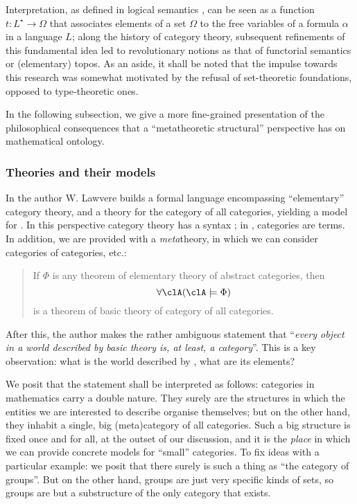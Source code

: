Interpretation, as defined in logical semantics \cite{}, can be seen as a function $t : L^\star \to \Omega$ that associates elements of a set $\Omega$ to the free variables of a formula $\alpha$ in a language $L$; along the history of category theory, subsequent refinements of this fundamental idea led to revolutionary notions as that of functorial semantics or (elementary) topos.
As an aside, it shall be noted that the impulse towards this research was somewhat motivated by the refusal of set-theoretic foundations, opposed to type-theoretic ones.

In the following subsection, we give a more fine-grained presentation of the philosophical consequences that a ``metatheoretic structural'' perspective has on mathematical ontology.
\subsubsection{Theories and their models}
In \cite{lajolla} the author W. Lawvere builds a formal language  encompassing ``elementary'' category theory, and a theory  for the category of all categories, yielding a model for . In this perspective category theory has a syntax \CT; in \CT, categories are terms. In addition, we are provided with a \emph{meta}theory, in which we can consider categories of categories, etc.:%
\begin{quote}
	If $\Phi$ is any theorem of elementary theory of abstract categories, then
  \[\forall \clA (\clA \models \Phi)\]
  is a theorem of basic theory of category of all categories. \hfill \cite{lajolla}
\end{quote}
After this, the author makes the rather ambiguous statement that ``\textit{every object in a world described by basic theory is, at least, a category}''. This is a key observation: what is the world described by , what are its elements?

We posit that the statement shall be interpreted as follows: categories in mathematics carry a double nature. They surely are the structures in which the entities we are interested to describe organise themselves; but on the other hand, they inhabit a single, big (meta)category of all categories. Such a big structure is fixed once and for all, at the outset of our discussion, and it is the \emph{place} in which we can provide concrete models for ``small'' categories. To fix ideas with a particular example: we posit that there surely is such a thing as ``the category of groups''. But on the other hand, groups are just very specific kinds of sets, so groups are but a substructure of the only category that exists.%

